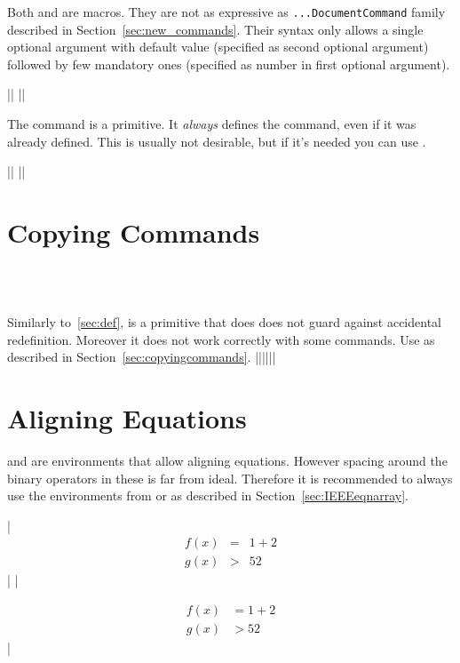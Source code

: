 Both  and  are  macros. They
are not as expressive as \texttt{...DocumentCommand} family  %
described in Section~\ref{sec:new_commands}. Their syntax only allows a single
optional argument with default value (specified as second optional argument)
followed by few mandatory ones (specified as number in first optional
argument).
\begin{chktexignore}
  \vchto|\newcommand{\foo}[4][bar]{ ... }|
  ||
\end{chktexignore}

The  command is a  primitive. It \emph{always} defines
the command, even if it was already defined. This is usually not desirable, but
if it's needed you can use .
\begin{chktexignore}
  \vchto|\def\foo#1#2#3{ ... }|
  ||
\end{chktexignore}

\section{Copying Commands}
 {
   \\
   \\
}

Similarly to~\ref{sec:def},  is a  primitive that does
does not guard against accidental redefinition. Moreover it does not work
correctly with some  commands. Use  as
described in Section~\ref{sec:copyingcommands}.
\chto|\let\foo\bar||\NewCommandCopy\foo\bar|

\section{Aligning Equations}

 and  are  environments that allow
aligning equations. However spacing around the binary operators in these is far
from ideal. Therefore it is recommended to always use the  environments
from  or  as described in
Section~\ref{sec:IEEEeqnarray}.
\begin{chktexignore}
\chto
|\begin{eqnarray}
  f(x) & = &  1 + 2 \\
  g(x) & > & 52
\end{eqnarray}|
|\usepackage{amsmath}
\begin{align}
  f(x) & = 1 + 2 \\
  g(x) & > 52
\end{align}|
\end{chktexignore}

